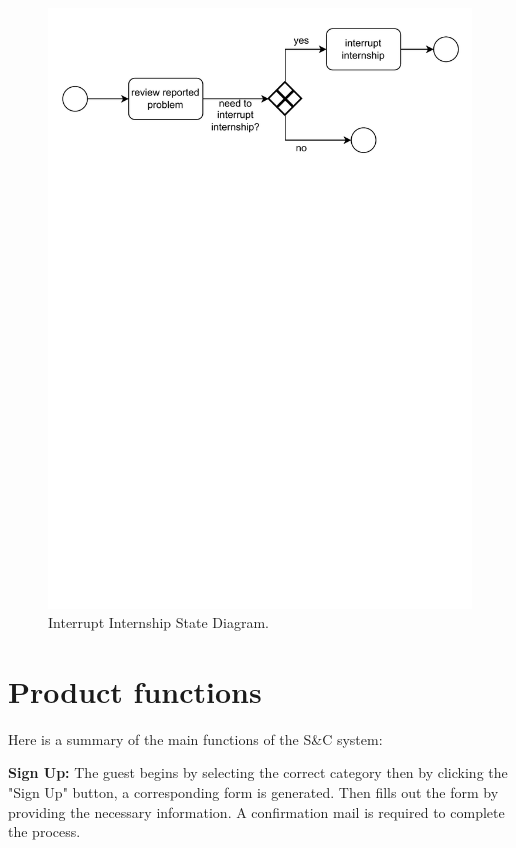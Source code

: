 \begin{figure}[H]
    \begin{center}
        \includegraphics[width=\linewidth]{Images/StateDiagram/InterruptInternship.pdf}
        \caption{Interrupt Internship State Diagram.}
        \label{fig:interrupt_intern_state_diag}%
    \end{center}
\end{figure}

\newpage

\section{Product functions}
\label{sec:product_functions}%

Here is a summary of the main functions of the S\&C system:

\textbf{Sign Up:} The guest begins by selecting the correct category then by clicking the "Sign Up" button, a corresponding form is generated. Then fills out the form by providing the necessary information. A confirmation mail is required to complete the process.

